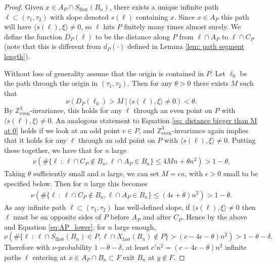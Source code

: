 \documentclass[11pt]{article}
\theoremstyle{remark}
\theoremstyle{definition}
\newcommand{\Z}{\mathbb{Z}}
\newcommand{\threeeven}{\Z^3_{\text{even}}}
\newcommand{\symindex}[1]{\index{{\textbf{Symbols}}!#1}}
\begin{document}
\begin{proof}
    Given $x\in A_P\cap S_{\text{first}}(B_n)$, there exists a unique infinite path $\ell\subset (\tau_1,\tau_2)$ with slope denoted $s(\ell)$ containing $x$. Since $x\in A_P$ this path will have $\langle s(\ell),\xi\rangle \neq 0$, so $\ell$ hits $P$ finitely many times almost surely. We define the function $D_P(\ell)$ to be the distance along $P$ from $\ell \cap A_P$ to $\ell \cap C_P$ (note that this is different from $d_P(\cdot)$ defined in Lemma \ref{lem: path segment length}). \symindex{Chapter 7!$D_P$}
    
    Without loss of generality assume that the origin is contained in $P$. Let $\ell_0$ be the path through the origin in $(\tau_1,\tau_2)$. Then for any $\theta>0$ there exists $M$ such that
    \begin{equation}\label{eq: distance bigger than M at 0}
       \nu ( D_P(\ell_0) > M ~|~ \langle s(\ell), \xi\rangle \neq 0 ) < \theta.
    \end{equation}
   By $\threeeven$-invariance, this holds for any $\ell$ through an even point on $P$ with $\langle s(\ell),\xi\rangle \neq 0$. An analogous statement to Equation \eqref{eq: distance bigger than M at 0} holds if we look at an odd point $v\in P$, and $\threeeven$-invariance again implies that it holds for any $\ell$ through an odd point on $P$ with $\langle s(\ell),\xi\rangle \neq 0$. Putting these together, we have that for $n$ large
   \begin{align*}
        \nu(\#\{\ell ~:~ \ell\cap C_P\not\in B_n, \ell \cap A_P\in B_n\} \leq 4 M n + \theta n^2) > 1 - \theta.
   \end{align*}
   Taking $\theta$ sufficiently small and $n$ large, we can set $M = \epsilon n$, with $\epsilon>0$ small to be specified below. Then for $n$ large this becomes 
   \begin{align*}
        \nu(\#\{\ell ~:~ \ell\cap C_P\not\in B_n, \ell \cap A_P\in B_n\} \leq (4 \epsilon +\theta)n^2) > 1 - \theta.
   \end{align*}
    As any infinite path $\ell\subset (\tau_1,\tau_2)$ has well-defined slope, if $\langle s(\ell),\xi\rangle\neq 0$ then $\ell$ must be on opposite sides of $P$ before $A_P$ and after $C_P$. 
    Hence by the above and Equation \eqref{eq:AP_lower}, for $n$ large enough,
    \begin{equation}\label{eq: exit not in P}
        \nu(\#\{\ell~:~ \ell \cap S_{\text{first}}(B_n)\in P, \ell\cap X_{\text{last}}(B_n)\not\in P\} > (c-4\epsilon - \theta)n^2 ) > 1-\theta-\delta. 
    \end{equation}
    Therefore with $\nu$-probability $1-\theta-\delta$, at least $c'n^2=(c-4\epsilon-\theta)n^2$ infinite paths $\ell$ entering at $x\in A_P\cap B_n\subset F$ exit $B_n$ at $y\not\in F$.
    

\end{proof}
\end{document}
